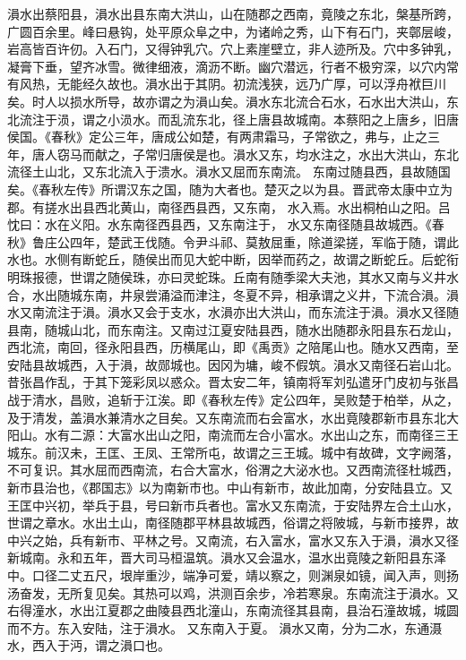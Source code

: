 \documentclass[12pt,UTF8]{ctexbook}
\begin{document}
溳水出蔡阳县，溳水出县东南大洪山，山在随郡之西南，竟陵之东北，槃基所跨，广圆百余里。峰曰悬钩，处平原众阜之中，为诸岭之秀，山下有石门，夹鄣层峻，岩高皆百许仞。入石门，又得钟乳穴。穴上素崖壁立，非人迹所及。穴中多钟乳，凝膏下垂，望齐冰雪。微律细液，滴沥不断。幽穴潜远，行者不极穷深，以穴内常有风热，无能经久故也。溳水出于其阴。初流浅狭，远乃广厚，可以浮舟袱巨川矣。时人以损水所导，故亦谓之为溳山矣。溳水东北流合石水，石水出大洪山，东北流注于涢，谓之小涢水。而乱流东北，径上唐县故城南。本蔡阳之上唐乡，旧唐侯国。《春秋》定公三年，唐成公如楚，有两肃霜马，子常欲之，弗与，止之三年，唐人窃马而献之，子常归唐侯是也。溳水又东，均水注之，水出大洪山，东北流径土山北，又东北流入于溃水。溳水又屈而东南流。
东南过随县西，县故随国矣。《春秋左传》所谓汉东之国，随为大者也。楚灭之以为县。晋武帝太康中立为郡。有搓水出县西北黄山，南径西县西，又东南， 水入焉。水出桐柏山之阳。吕忱曰：水在义阳。水东南径西县西，又东南注于， 水又东南径随县故城西。《春秋》鲁庄公四年，楚武王伐随。令尹斗祁、莫敖屈重，除道梁搓，军临于随，谓此水也。水侧有断蛇丘，随侯出而见大蛇中断，因举而药之，故谓之断蛇丘。后蛇衔明珠报德，世谓之随侯珠，亦曰灵蛇珠。丘南有随季梁大夫池，其水又南与义井水合，水出随城东南，井泉尝涌溢而津注，冬夏不异，相承谓之义井，下流合溳。溳水又南流注于溳。溳水又会于支水，水溳亦出大洪山，而东流注于溳。溳水又径随县南，随城山北，而东南注。又南过江夏安陆县西，随水出随郡永阳县东石龙山，西北流，南回，径永阳县西，历横尾山，即《禹贡》之陪尾山也。随水又西南，至安陆县故城西，入于溳，故郧城也。因冈为墉，峻不假筑。溳水又南径石岩山北。昔张昌作乱，于其下笼彩凤以惑众。晋太安二年，镇南将军刘弘遣牙门皮初与张昌战于清水，昌败，追斩于江涘。即《春秋左传》定公四年，吴败楚于柏举，从之，及于清发，盖溳水兼清水之目矣。又东南流而右会富水，水出竟陵郡新市县东北大阳山。水有二源：大富水出山之阳，南流而左合小富水。水出山之东，而南径三王城东。前汉未，王匡、王凤、王常所屯，故谓之三王城。城中有故碑，文字阙落，不可复识。其水屈而西南流，右合大富水，俗渭之大泌水也。又西南流径杜城西，新市县治也，《郡国志》以为南新市也。中山有新市，故此加南，分安陆县立。又王匡中兴初，举兵于县，号曰新市兵者也。富水又东南流，于安陆界左合土山水，世谓之章水。水出土山，南径随郡平林县故城西，俗谓之将陂城，与新市接界，故中兴之始，兵有新市、平林之号。又南流，右入富水，富水又东入于溳，溳水又径新城南。永和五年，晋大司马桓温筑。溳水又会温水，温水出竟陵之新阳县东泽中。口径二丈五尺，垠岸重沙，端净可爱，靖以察之，则渊泉如镜，闻入声，则扬汤奋发，无所复见矣。其热可以鸡，洪测百余步，冷若寒泉。东南流注于溳水。又右得潼水，水出江夏郡之曲陵县西北潼山，东南流径其县南，县治石潼故城，城圆而不方。东入安陆，注于溳水。
又东南入于夏。
溳水又南，分为二水，东通滠水，西入于沔，谓之溳口也。
\end{document}
